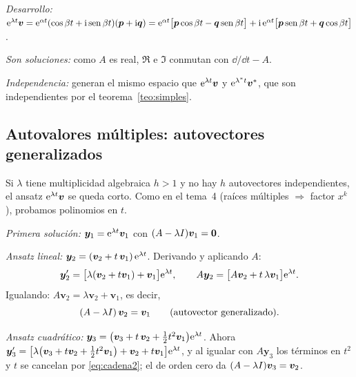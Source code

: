 \documentclass[11pt,twoside]{article}
\newcommand\vy{\bm{y}}
\newcommand\vv{\bm{v}}
\newcommand\vp{\bm{p}}
\newcommand\vq{\bm{q}}
\begin{document}
\begin{demostracion}
\begin{pasos}
\item \emph{Desarrollo:} $\e^{\lambda t}\vv=\e^{\alpha t}(\cos\beta t+\iu\sen\beta t)(\vp+\iu\vq)
=\e^{\alpha t}\big[\vp\cos\beta t-\vq\sen\beta t\big]+\iu\,\e^{\alpha t}\big[\vp\sen\beta t+\vq\cos\beta t\big]$.
\item \emph{Son soluciones:} como $A$ es real, $\Re$ e $\Im$ conmutan con $\dd/\dd t-A$.
\item \emph{Independencia:} generan el mismo espacio que $\e^{\lambda t}\vv$ y $\e^{\lambda^*t}\vv^*$, que son
independientes por el teorema~\ref{teo:simples}.
\end{pasos}
\end{demostracion}

\subsection{Autovalores múltiples: autovectores generalizados}\label{sec:multiples}

Si $\lambda$ tiene multiplicidad algebraica $h>1$ y no hay $h$ autovectores independientes, el ansatz
$\e^{\lambda t}\vv$ se queda corto. Como en el tema~4 (raíces múltiples $\Rightarrow$ factor $x^k$), probamos
polinomios en $t$.

\begin{pasos}
\item \emph{Primera solución:} $\vy_1=\e^{\lambda t}\vv_1$ con $(A-\lambda\Id)\vv_1=\bm0$.
\item \emph{Ansatz lineal:} $\vy_2=(\vv_2+t\,\vv_1)\,\e^{\lambda t}$. Derivando y aplicando $A$:
\begin{equation*}
\vy_2'=\big[\lambda(\vv_2+t\vv_1)+\vv_1\big]\e^{\lambda t},\qquad
A\vy_2=\big[A\vv_2+t\,\lambda\vv_1\big]\e^{\lambda t}.
\end{equation*}
Igualando: $A\vv_2=\lambda\vv_2+\vv_1$, es decir,
\begin{equation}\label{eq:cadena2}
(A-\lambda\Id)\,\vv_2=\vv_1\qquad(\text{autovector generalizado}).
\end{equation}
\item \emph{Ansatz cuadrático:} $\vy_3=\big(\vv_3+t\,\vv_2+\tfrac12t^2\vv_1\big)\e^{\lambda t}$. Ahora
$\vy_3'=\big[\lambda\big(\vv_3+t\vv_2+\tfrac12t^2\vv_1\big)+\vv_2+t\vv_1\big]\e^{\lambda t}$, y al igualar con
$A\vy_3$ los términos en $t^2$ y $t$ se cancelan por \eqref{eq:cadena2}; el de orden cero da $(A-\lambda\Id)\vv_3=\vv_2$.
\end{pasos}
\end{document}

